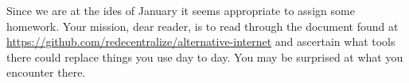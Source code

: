 Since we are at the ides of January it seems appropriate to assign some
homework. Your mission, dear reader, is to read through the document
found at \url{https://github.com/redecentralize/alternative-internet}
and ascertain what tools there could replace things you use day to day.
You may be surprised at what you encounter there.
